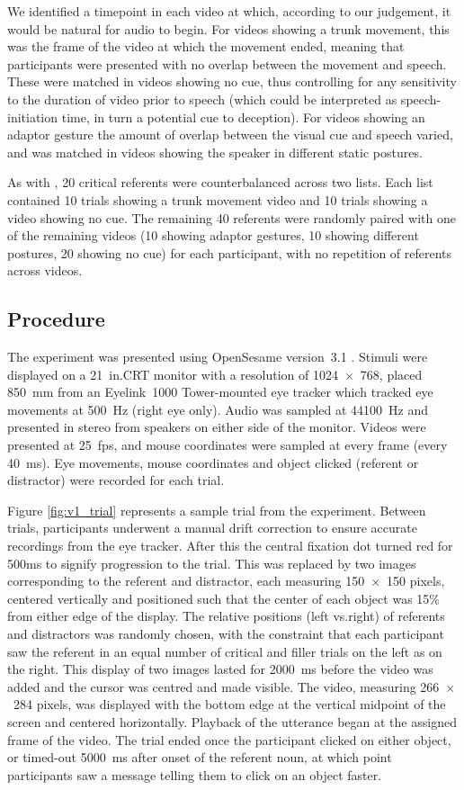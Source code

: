 \documentclass[a4paper,man,natbib]{apa6}
\begin{document}
We identified a timepoint in each video at which, according to our judgement, it would be natural for audio to begin. 
For videos showing a trunk movement, this was the frame of the video at which the movement ended, meaning that participants were presented with no overlap between the movement and speech.
These were matched in videos showing no cue, thus controlling for any sensitivity to the duration of video prior to speech (which could be interpreted as speech-initiation time, in turn a potential cue to deception). 
For videos showing an adaptor gesture the amount of overlap between the visual cue and speech varied, and was matched in videos showing the speaker in different static postures.

As with \citet{Loy2017}, 20 critical referents were counterbalanced across two lists. 
Each list contained 10 trials showing a trunk movement video and 10 trials showing a video showing no cue.
The remaining 40 referents were randomly paired with one of the remaining videos (10 showing adaptor gestures, 10 showing different postures, 20 showing no cue) for each participant, with no repetition of referents across videos.

\subsection{Procedure}
The experiment was presented using OpenSesame version~3.1 \citep{Mathot2012}.
Stimuli were displayed on a 21~in.\@ CRT monitor with a resolution of 1024~$\times$~768, placed 850~mm from an Eyelink~1000 Tower-mounted eye tracker which tracked eye movements at 500~Hz (right eye only). 
Audio was sampled at 44100~Hz and presented in stereo from speakers on either side of the monitor. 
Videos were presented at 25~fps, and mouse coordinates were sampled at every frame (every 40~ms).
Eye movements, mouse coordinates and object clicked (referent or distractor) were recorded for each trial.

Figure \ref{fig:v1_trial} represents a sample trial from the experiment. 
Between trials, participants underwent a manual drift correction to ensure accurate recordings from the eye tracker.
After this the central fixation dot turned red for 500ms to signify progression to the trial. 
This was replaced by two images corresponding to the referent and distractor, each measuring 150~$\times$~150 pixels, centered vertically and positioned such that the center of each object was 15\% from either edge of the display. 
The relative positions (left vs.\@ right) of referents and distractors was randomly chosen, with the constraint that each participant saw the referent in an equal number of critical and filler trials on the left as on the right.
This display of two images lasted for 2000~ms before the video was added and the cursor was centred and made visible.
The video, measuring 266~$\times$~284 pixels, was displayed with the bottom edge at the vertical midpoint of the screen and centered horizontally.
Playback of the utterance began at the assigned frame of the video.
The trial ended once the participant clicked on either object, or timed-out 5000~ms after onset of the referent noun, at which point participants saw a message telling them to click on an object faster.
\end{document}

